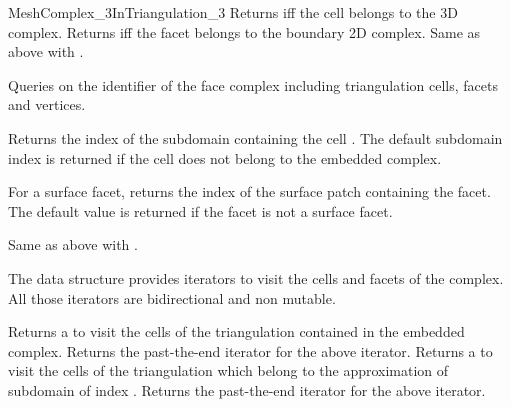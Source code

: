 \begin{ccRefConcept}{MeshComplex_3InTriangulation_3}
{Returns  iff the cell  belongs to the 3D complex.}
\ccGlue
{}
{Returns  iff the facet  belongs to the boundary 2D complex.}
\ccGlue
{}
{Same as above with .}


Queries on the identifier of the face complex 
including triangulation cells, facets and vertices.

{Returns the index of the subdomain containing
  the cell .
The default subdomain index is returned if the cell   does not belong
to the embedded complex.}

{For a surface facet, returns  the index of the surface patch containing the facet.
The default  value
is returned if the facet is not a surface facet.} 


{Same as above with .}





The data structure provides iterators to visit the cells and facets of the complex.
All those iterators are bidirectional and non mutable.

{Returns a  to visit the cells of the triangulation contained in the embedded complex.}
\ccGlue
{}
{Returns the past-the-end iterator for the above iterator.}
\ccGlue
{}
{Returns a  to visit the cells of the triangulation
which belong to the approximation of subdomain of index .}
\ccGlue
{}
{Returns the past-the-end iterator for the above iterator.}


\end{ccRefConcept}
